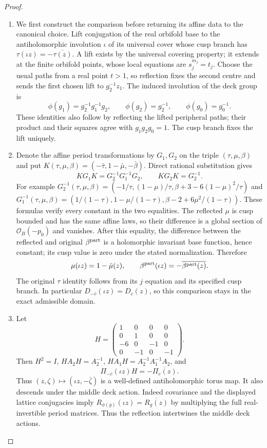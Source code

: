 \begin{proof}
\begin{enumerate}[label=\arabic*.,leftmargin=*]
\item We first construct the comparison before returning its affine data to the canonical choice. Lift conjugation of the real orbifold base to the antiholomorphic involution $\iota$ of its universal cover whose cusp branch has $\tau(\iota z)=-\overline{\tau(z)}$. A lift exists by the universal covering property; it extends at the finite orbifold points, whose local equations are $s_j^{m_j}=t_j$. Choose the usual paths from a real point $t>1$, so reflection fixes the second centre and sends the first chosen lift to $g_2^{-1}z_1$. The induced involution of the deck group is
\[
 \phi(g_1)=g_2^{-1}g_1^{-1}g_2,\qquad
 \phi(g_2)=g_2^{-1},\qquad \phi(g_0)=g_0^{-1}.
\]
These identities also follow by reflecting the lifted peripheral paths; their product and their squares agree with $g_1g_2g_0=1$. The cusp branch fixes the lift uniquely.

\item Denote the affine period transformations by $G_1,G_2$ on the triple $(\tau,\mu,\beta)$ and put $K(\tau,\mu,\beta)=(-\bar\tau,1-\bar\mu,-\bar\beta)$. Direct rational substitution gives
\[
 KG_1K=G_2^{-1}G_1^{-1}G_2,\qquad KG_2K=G_2^{-1}.
\]
For example $G_2^{-1}(\tau,\mu,\beta)=(-1/\tau,(1-\mu)/\tau,\beta+3-6(1-\mu)^2/\tau)$ and
$G_1^{-1}(\tau,\mu,\beta)=(1/(1-\tau),1-\mu/(1-\tau),\beta-2+6\mu^2/(1-\tau))$. These formulas verify every constant in the two equalities. The reflected $\mu$ is cusp bounded and has the same affine laws, so their difference is a global section of $\mathcal O_B(-p_0)$ and vanishes. After this equality, the difference between the reflected and original $\beta^{\rm part}$ is a holomorphic invariant base function, hence constant; its cusp value is zero under the stated normalization. Therefore
\[
 \mu(\iota z)=1-\bar\mu(z),\qquad
 \beta^{\rm part}(\iota z)=-\overline{\beta^{\rm part}(z)}.
\]
The original $\tau$ identity follows from its $j$ equation and its specified cusp branch. In particular $D_{-\bar c}(\iota z)=D_c(z)$, so this comparison stays in the exact admissible domain.

\item Let
\begin{equation}
 H=\begin{pmatrix}1&0&0&0\\0&1&0&0\\-6&0&-1&0\\0&-1&0&-1\end{pmatrix}.
 \label{I:eq:real-reflection-matrix}
\end{equation}
Then $H^2=I$, $HA_2H=A_2^{-1}$, $HA_1H=A_2^{-1}A_1^{-1}A_2$, and
\[
 \Pi_{-\bar c}(\iota z)H=-\overline{\Pi_c(z)}.
\]
Thus $(z,\zeta)\mapsto(\iota z,-\bar\zeta)$ is a well-defined antiholomorphic torus map. It also descends under the middle deck action. Indeed covariance and the displayed lattice conjugacies imply $R_{\phi(g)}(\iota z)=\overline{R_g(z)}$ by multiplying the full real-invertible period matrices. Thus the reflection intertwines the middle deck actions.


\end{enumerate}
\end{proof}
